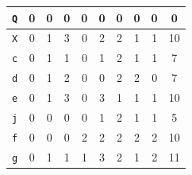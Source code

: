 \documentclass[submit]{ipsj}
\begin{document}
\begin{table}[t]
\begin{minipage}[t]{0.55\linewidth}
{\begin{tabular}{c|c|cccccccc}
\rowcolor{blue!30}%
\texttt{\large{Q}}                   & 0                                           & \multicolumn{1}{c|}{0} & \multicolumn{1}{c|}{0} & \multicolumn{1}{c|}{0} & \multicolumn{1}{c|}{0} & \multicolumn{1}{c|}{0} & \multicolumn{1}{c|}{0} & \multicolumn{1}{c|}{0} & 0  \\ \hline
\texttt{\large{X}}                   & 0                                           & \multicolumn{1}{c|}{1} & \multicolumn{1}{c|}{3} & \multicolumn{1}{c|}{0} & \multicolumn{1}{c|}{2} & \multicolumn{1}{c|}{2} & \multicolumn{1}{c|}{1} & \multicolumn{1}{c|}{1} & 10  \\ \hline
\rowcolor{blue!30}%
\texttt{\large{c}}                   & 0                                           & \multicolumn{1}{c|}{1} & \multicolumn{1}{c|}{1} & \multicolumn{1}{c|}{0} & \multicolumn{1}{c|}{1} & \multicolumn{1}{c|}{2} & \multicolumn{1}{c|}{1} & \multicolumn{1}{c|}{1} & 7  \\ \hline
\rowcolor{blue!30}%
\texttt{\large{d}}                   & 0                                           & \multicolumn{1}{c|}{1} & \multicolumn{1}{c|}{2} & \multicolumn{1}{c|}{0} & \multicolumn{1}{c|}{0} & \multicolumn{1}{c|}{2} & \multicolumn{1}{c|}{2} & \multicolumn{1}{c|}{0} & 7  \\ \hline
\texttt{\large{e}}                   & 0                                           & \multicolumn{1}{c|}{1} & \multicolumn{1}{c|}{3} & \multicolumn{1}{c|}{0} & \multicolumn{1}{c|}{3} & \multicolumn{1}{c|}{1} & \multicolumn{1}{c|}{1} & \multicolumn{1}{c|}{1} & 10  \\ \hline
\texttt{\large{j}}                   & 0                                           & \multicolumn{1}{c|}{0} & \multicolumn{1}{c|}{0} & \multicolumn{1}{c|}{0} & \multicolumn{1}{c|}{1} & \multicolumn{1}{c|}{2} & \multicolumn{1}{c|}{1} & \multicolumn{1}{c|}{1} & 5  \\ \hline
\rowcolor{blue!30}%
\texttt{\large{f}}                   & 0                                           & \multicolumn{1}{c|}{0} & \multicolumn{1}{c|}{0} & \multicolumn{1}{c|}{2} & \multicolumn{1}{c|}{2} & \multicolumn{1}{c|}{2} & \multicolumn{1}{c|}{2} & \multicolumn{1}{c|}{2} & 10  \\ \hline
\rowcolor{blue!30}%
\texttt{\large{g}}                   & 0                                           & \multicolumn{1}{c|}{1} & \multicolumn{1}{c|}{1} & \multicolumn{1}{c|}{1} & \multicolumn{1}{c|}{3} & \multicolumn{1}{c|}{2} & \multicolumn{1}{c|}{1} & \multicolumn{1}{c|}{2} & 11 \\ \hline
\end{tabular}
}
  \end{minipage}
  \vspace{-4mm}
\end{table}
\end{document}
